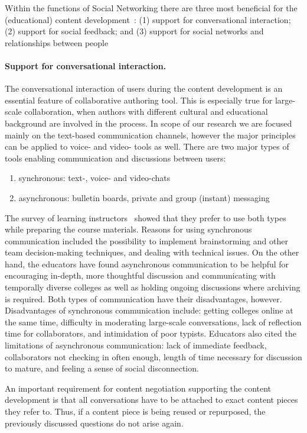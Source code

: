 \documentclass[ngerman,UKenglish,table]{scrbook}
\begin{document}
Within the functions of Social Networking there are three most beneficial for the (educational) content development~\cite{boyd2007youth}:
(1) support for conversational interaction; (2) support for social feedback; and 
(3) support for social networks and relationships between people

\paragraph{Support for conversational interaction.}
The conversational interaction of users during the content development is an essential feature of collaborative authoring tool.
This is especially true for large-scale collaboration, when authors with different cultural and educational background are involved in the process.
In scope of our research we are focused mainly on the text-based communication channels, however the major principles can be applied to voice- and video- tools as well.
There are two major types of tools enabling communication and discussions between users: 
\begin{enumerate}
\item{synchronous}: text-, voice- and video-chats
\item{asynchronous}: bulletin boards, private and group (instant) messaging
\end{enumerate}

The survey of learning instructors~\cite{branon2001synchronous} showed that they prefer to use both types while preparing the course materials.
Reasons for using synchronous communication included the possibility to implement brainstorming and other team decision-making techniques, and dealing with technical issues.
On the other hand, the educators have found asynchronous communication to be helpful for encouraging in-depth, more thoughtful discussion and communicating with temporally diverse colleges as well as holding ongoing discussions where archiving is required. 
Both types of communication have their disadvantages, however. Disadvantages of synchronous communication include: getting colleges online at the same time, difficulty in moderating large-scale conversations, lack of reflection time for collaborators, and intimidation of poor typists.
Educators also cited the limitations of asynchronous communication: lack of immediate feedback, collaborators not checking in often enough, length of time necessary for discussion to mature, and feeling a sense of social disconnection.

An important requirement for content negotiation supporting the content development is that all conversations have to be attached to exact content pieces they refer to.
Thus, if a content piece is being reused or repurposed, the previously discussed questions do not arise again.
\end{document}
